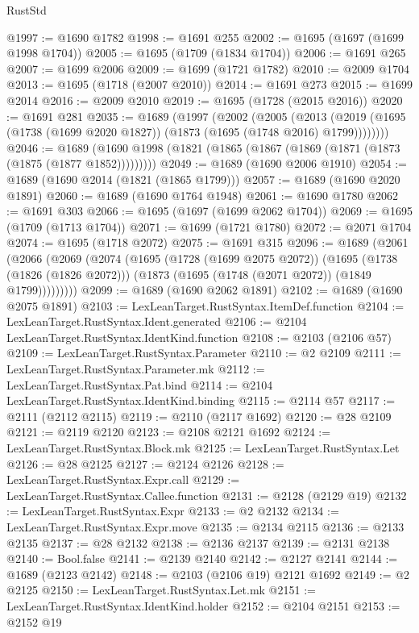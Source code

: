 \begin{lexlean}{RustStd}
\begin{coremodule}
@1997 := @1690 @1782
@1998 := @1691 @255
@2002 := @1695 (@1697 (@1699 @1998 @1704))
@2005 := @1695 (@1709 (@1834 @1704))
@2006 := @1691 @265
@2007 := @1699 @2006
@2009 := @1699 (@1721 @1782)
@2010 := @2009 @1704
@2013 := @1695 (@1718 (@2007 @2010))
@2014 := @1691 @273
@2015 := @1699 @2014
@2016 := @2009 @2010
@2019 := @1695 (@1728 (@2015 @2016))
@2020 := @1691 @281
@2035 := @1689
    (@1997
      (@2002
        (@2005
          (@2013 (@2019 (@1695 (@1738 (@1699 @2020 @1827)) (@1873 (@1695 (@1748 @2016) @1799))))))))
@2046 := @1689 (@1690 @1998 (@1821 (@1865 (@1867 (@1869 (@1871 (@1873 (@1875 (@1877 @1852)))))))))
@2049 := @1689 (@1690 @2006 @1910)
@2054 := @1689 (@1690 @2014 (@1821 (@1865 @1799)))
@2057 := @1689 (@1690 @2020 @1891)
@2060 := @1689 (@1690 @1764 @1948)
@2061 := @1690 @1780
@2062 := @1691 @303
@2066 := @1695 (@1697 (@1699 @2062 @1704))
@2069 := @1695 (@1709 (@1713 @1704))
@2071 := @1699 (@1721 @1780)
@2072 := @2071 @1704
@2074 := @1695 (@1718 @2072)
@2075 := @1691 @315
@2096 := @1689
    (@2061
      (@2066
        (@2069
          (@2074
            (@1695
              (@1728 (@1699 @2075 @2072))
              (@1695
                (@1738 (@1826 (@1826 @2072)))
                (@1873 (@1695 (@1748 (@2071 @2072)) (@1849 @1799)))))))))
@2099 := @1689 (@1690 @2062 @1891)
@2102 := @1689 (@1690 @2075 @1891)
@2103 := LexLeanTarget.RustSyntax.ItemDef.function
@2104 := LexLeanTarget.RustSyntax.Ident.generated
@2106 := @2104 LexLeanTarget.RustSyntax.IdentKind.function
@2108 := @2103 (@2106 @57)
@2109 := LexLeanTarget.RustSyntax.Parameter
@2110 := @2 @2109
@2111 := LexLeanTarget.RustSyntax.Parameter.mk
@2112 := LexLeanTarget.RustSyntax.Pat.bind
@2114 := @2104 LexLeanTarget.RustSyntax.IdentKind.binding
@2115 := @2114 @57
@2117 := @2111 (@2112 @2115)
@2119 := @2110 (@2117 @1692)
@2120 := @28 @2109
@2121 := @2119 @2120
@2123 := @2108 @2121 @1692
@2124 := LexLeanTarget.RustSyntax.Block.mk
@2125 := LexLeanTarget.RustSyntax.Let
@2126 := @28 @2125
@2127 := @2124 @2126
@2128 := LexLeanTarget.RustSyntax.Expr.call
@2129 := LexLeanTarget.RustSyntax.Callee.function
@2131 := @2128 (@2129 @19)
@2132 := LexLeanTarget.RustSyntax.Expr
@2133 := @2 @2132
@2134 := LexLeanTarget.RustSyntax.Expr.move
@2135 := @2134 @2115
@2136 := @2133 @2135
@2137 := @28 @2132
@2138 := @2136 @2137
@2139 := @2131 @2138
@2140 := Bool.false
@2141 := @2139 @2140
@2142 := @2127 @2141
@2144 := @1689 (@2123 @2142)
@2148 := @2103 (@2106 @19) @2121 @1692
@2149 := @2 @2125
@2150 := LexLeanTarget.RustSyntax.Let.mk
@2151 := LexLeanTarget.RustSyntax.IdentKind.holder
@2152 := @2104 @2151
@2153 := @2152 @19

\end{coremodule}
\end{lexlean}
